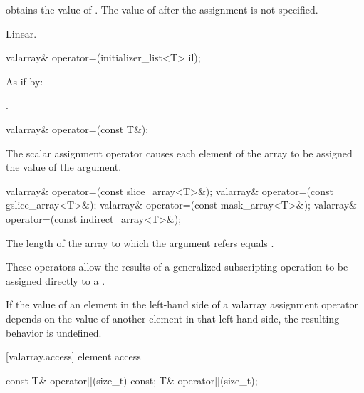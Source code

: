 \begin{itemdescr}
\pnum
\effects {} obtains the value of .
The value of  after the assignment is not specified.

\pnum
\complexity Linear.
\end{itemdescr}

%
\begin{itemdecl}
valarray& operator=(initializer_list<T> il);
\end{itemdecl}

\begin{itemdescr}
\pnum
\effects As if by: 

\pnum
\returns {}.
\end{itemdescr}


%
\begin{itemdecl}
valarray& operator=(const T&);
\end{itemdecl}

\begin{itemdescr}
\pnum
The scalar assignment operator causes each element of the
array to be assigned the value of the argument.
\end{itemdescr}

%
\begin{itemdecl}
valarray& operator=(const slice_array<T>&);
valarray& operator=(const gslice_array<T>&);
valarray& operator=(const mask_array<T>&);
valarray& operator=(const indirect_array<T>&);
\end{itemdecl}

\begin{itemdescr}
\pnum
\requires The length of the array to which the argument refers equals .

\pnum
These operators allow the results of a generalized subscripting operation
to be assigned directly to a
.

\pnum
If the value of an element in the left-hand side of a valarray assignment
operator depends on the value of another element in that left-hand side,
the resulting behavior is undefined.
\end{itemdescr}

[valarray.access]{ element access}

%
\begin{itemdecl}
const T&  operator[](size_t) const;
T& operator[](size_t);
\end{itemdecl}

